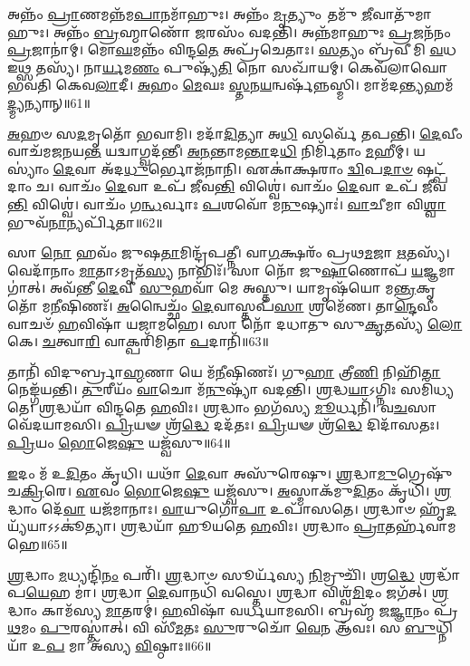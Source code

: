 𑌅𑌨𑍍𑌨𑌂᳴ \ul{𑌪𑍍𑌰𑌾}\-𑌣𑌮𑌨𑍍𑌨᳴𑌮\-\ul{𑌪𑌾}\-𑌨𑌮𑌾᳴𑌹𑍁𑌃।
𑌅𑌨𑍍𑌨𑌂᳴ \ul{𑌮𑍃}\-𑌤𑍍𑌯𑍁𑌂 𑌤𑌮𑍁᳴ \ul{𑌜𑍀}\-𑌵𑌾𑌤𑍁᳴𑌮𑌾𑌹𑍁𑌃।
𑌅𑌨𑍍𑌨𑌂᳴ \ul{𑌬𑍍𑌰}\-𑌹𑍍𑌮𑌾𑌣𑍋᳴ \ul{𑌜}\-𑌰𑌸𑌂᳴  𑌵𑌦𑌨𑍍𑌤𑌿।
𑌅𑌨𑍍𑌨᳴𑌮𑌾𑌹𑍁𑌃 \ul{𑌪𑍍𑌰}\-𑌜𑌨᳴𑌨𑌂 \ul{𑌪𑍍𑌰}\-𑌜𑌾𑌨𑌾॑𑌮𑍍।
𑌮𑍋\-\ul{𑌘}\-𑌮𑌨𑍍𑌨𑌂᳴ 𑌵𑌿𑌨𑍍𑌦\-\ul{𑌤𑍇} 𑌅𑌪𑍍𑌰᳴𑌚𑍇𑌤𑌾𑌃।
\-\ul{𑌸}\-𑌤𑍍𑌯𑌂 𑌬𑍍𑌰᳴𑌵𑍀𑌮𑌿 \ul{𑌵}\-𑌧 𑌇𑌥𑍍𑌸 𑌤𑌸𑍍𑌯᳴।
𑌨𑌾\-\ul{𑌰𑍍𑌯}\-𑌮\-\ul{𑌣𑌂} 𑌪𑍁𑌷𑍍𑌯᳴\-\ul{𑌤𑌿} 𑌨𑍋 𑌸𑌖𑌾᳴𑌯𑌮𑍍।
𑌕𑍇𑌵᳴𑌲𑌾𑌘𑍋 𑌭𑌵𑌤𑌿 𑌕𑍇𑌵\-\ul{𑌲𑌾}\-𑌦𑍀।
\-\ul{𑌅}\-𑌹𑌂 \ul{𑌮𑍇}\-𑌘𑌃 \ul{𑌸𑍍𑌤}\-𑌨\-\ul{𑌯}\-𑌨𑍍𑌵𑌰𑍍\mbox{}𑌷᳴𑌨𑍍𑌨𑌸𑍍𑌮𑌿।
𑌮𑌾𑌮᳴𑌦\-\ul{𑌨𑍍𑌤𑍍𑌯}\-𑌹𑌮᳴\-\ul{𑌦𑍍𑌮𑍍𑌯}\-𑌨𑍍𑌯𑌾𑌨𑍍॥61॥

\-\ul{𑌅}\-𑌹𑍞 𑌸\-\ul{𑌦}\-𑌮𑍃𑌤𑍋᳴ 𑌭𑌵𑌾𑌮𑌿।
𑌮𑌦𑌾᳴\-\ul{𑌦𑌿}\-𑌤𑍍𑌯𑌾 𑌅\-\ul{𑌧𑌿} 𑌸𑌰𑍍𑌵𑍇᳴ 𑌤𑌪𑌨𑍍𑌤𑌿।
\-\ul{𑌦𑍇}\-𑌵𑍀𑌂 𑌵𑌾𑌚᳴𑌮𑌜𑌨𑌯\-\ul{𑌨𑍍𑌤} 𑌯𑌦𑍍𑌵𑌾𑌗𑍍𑌵𑌦᳴𑌨𑍍𑌤𑍀।
\-\ul{𑌅}\-\-\ul{𑌨}\-𑌨𑍍𑌤𑌾𑌮\-\ul{𑌨𑍍𑌤𑌾}\-𑌦\-\ul{𑌧𑌿} 𑌨𑌿𑌰𑍍𑌮𑌿᳴𑌤𑌾𑌂 \ul{𑌮}\-𑌹𑍀𑌮𑍍।
𑌯𑌸𑍍𑌯𑌾𑌂॑ \ul{𑌦𑍇}\-𑌵𑌾 𑌅᳴𑌦\-\ul{𑌧𑍁}\-𑌰𑍍𑌭𑍋𑌜᳴𑌨𑌾𑌨𑌿।
𑌏𑌕𑌾॑𑌕𑍍𑌷𑌰𑌾𑌂 \ul{𑌦𑍍𑌵𑌿}\-𑌪\-\ul{𑌦𑌾}\-\-\ul{𑍞} 𑌷𑌟𑍍𑌪᳴𑌦𑌾𑌂 𑌚।
𑌵𑌾𑌚𑌂᳴ \ul{𑌦𑍇}\-𑌵𑌾 𑌉𑌪᳴ 𑌜𑍀𑌵\-\ul{𑌨𑍍𑌤𑌿} 𑌵𑌿𑌶𑍍𑌵𑍇॑।
𑌵𑌾𑌚𑌂᳴ \ul{𑌦𑍇}\-𑌵𑌾 𑌉𑌪᳴ 𑌜𑍀𑌵\-\ul{𑌨𑍍𑌤𑌿} 𑌵𑌿𑌶𑍍𑌵𑍇॑।
𑌵𑌾𑌚𑌂᳴ 𑌗\-\ul{𑌨𑍍𑌧}\-𑌰𑍍𑌵𑌾𑌃 \ul{𑌪}\-𑌶𑌵𑍋᳴ 𑌮\-\ul{𑌨𑍁}\-𑌷𑍍𑌯𑌾𑌃॑।
\-\ul{𑌵𑌾}\-𑌚𑍀𑌮𑌾 𑌵𑌿\-\ul{𑌶𑍍𑌵𑌾} 𑌭𑍁𑌵᳴\-\ul{𑌨𑌾}\-𑌨𑍍𑌯𑌰𑍍𑌪𑌿᳴𑌤𑌾॥62॥

𑌸𑌾 \ul{𑌨𑍋} 𑌹𑌵𑌂᳴ 𑌜𑍁𑌷\-\ul{𑌤𑌾}\-𑌮𑌿𑌨𑍍𑌦𑍍𑌰᳴𑌪𑌤𑍍𑌨𑍀।
𑌵𑌾\-\ul{𑌗}\-𑌕𑍍𑌷𑌰𑌂᳴ 𑌪𑍍𑌰𑌥\-\ul{𑌮}\-𑌜𑌾 \ul{𑌋}\-𑌤𑌸𑍍𑌯᳴।
𑌵𑍇𑌦𑌾᳴𑌨𑌾𑌂 \ul{𑌮𑌾}\-𑌤𑌾\-𑌽𑌮𑍃𑌤᳴\-\ul{𑌸𑍍𑌯} 𑌨𑌾𑌭𑌿𑌃᳴।
𑌸𑌾 𑌨𑍋᳴ 𑌜𑍁\-\ul{𑌷𑌾}\-𑌣𑍋𑌪᳴ \ul{𑌯}\-𑌜𑍍𑌞𑌮𑌾𑌗𑌾॑𑌤𑍍।
𑌅𑌵᳴𑌨𑍍𑌤𑍀 \ul{𑌦𑍇}\-𑌵𑍀 \ul{𑌸𑍁}\-𑌹𑌵𑌾᳴ 𑌮𑍇 𑌅𑌸𑍍𑌤𑍁।
𑌯𑌾𑌮𑍃𑌷᳴𑌯𑍋 𑌮\-\ul{𑌨𑍍𑌤𑍍𑌰}\-𑌕𑍃𑌤𑍋᳴ 𑌮\-\ul{𑌨𑍀}\-𑌷𑌿𑌣𑌃᳴।
\-\ul{𑌅}\-𑌨𑍍𑌵𑍈𑌚𑍍𑌛𑌂᳴ \ul{𑌦𑍇}\-𑌵𑌾𑌸𑍍𑌤𑌪᳴\-\ul{𑌸𑌾} 𑌶𑍍𑌰𑌮𑍇᳴𑌣।
𑌤𑌾\-\ul{𑌨𑍍𑌦𑍇}\-𑌵𑍀𑌂 𑌵𑌾𑌚𑍞᳴ \ul{𑌹}\-𑌵𑌿𑌷𑌾᳴ 𑌯𑌜𑌾𑌮𑌹𑍇।
𑌸𑌾 𑌨𑍋᳴ 𑌦𑌧𑌾𑌤𑍁 𑌸𑍁\-\ul{𑌕𑍃}\-𑌤𑌸𑍍𑌯᳴ \ul{𑌲𑍋}\-𑌕𑍇।
\-\ul{𑌚}\-𑌤𑍍𑌵𑌾\-\ul{𑌰𑌿} 𑌵𑌾𑌕𑍍𑌪𑌰𑌿᳴𑌮𑌿𑌤𑌾 \ul{𑌪}\-𑌦𑌾𑌨𑌿᳴॥63॥

𑌤𑌾𑌨𑌿᳴ 𑌵𑌿𑌦𑍁𑌰𑍍𑌬𑍍𑌰𑌾\-\ul{𑌹𑍍𑌮}\-𑌣𑌾 𑌯𑍇 𑌮᳴\-\ul{𑌨𑍀}\-𑌷𑌿𑌣𑌃᳴।
𑌗𑍁\-\ul{𑌹𑌾} 𑌤𑍍𑌰𑍀\-\ul{𑌣𑌿} 𑌨𑌿𑌹𑌿᳴\-\ul{𑌤𑌾} 𑌨𑍇𑌙𑍍𑌗᳴𑌯𑌨𑍍𑌤𑌿।
\-\ul{𑌤𑍁}\-𑌰𑍀𑌯𑌂᳴ \ul{𑌵𑌾}\-𑌚𑍋 𑌮᳴\-\ul{𑌨𑍁}\-𑌷𑍍𑌯𑌾᳴ 𑌵𑌦𑌨𑍍𑌤𑌿।
\-\ul{𑌶𑍍𑌰}\-𑌦𑍍𑌧\-\ul{𑌯𑌾}\-\-𑌽𑌗𑍍𑌨𑌿𑌃 𑌸𑌮𑌿᳴𑌧𑍍𑌯𑌤𑍇।
\-\ul{𑌶𑍍𑌰}\-𑌦𑍍𑌧𑌯𑌾᳴ 𑌵𑌿𑌨𑍍𑌦𑌤𑍇 \ul{𑌹}\-𑌵𑌿𑌃।
\-\ul{𑌶𑍍𑌰}\-𑌦𑍍𑌧𑌾𑌂 𑌭𑌗᳴𑌸𑍍𑌯 \ul{𑌮𑍂}\-𑌰𑍍𑌧𑌨𑌿᳴।
𑌵\-\ul{𑌚}\-𑌸𑌾 𑌵𑍇᳴𑌦𑌯𑌾𑌮𑌸𑌿।
\-\ul{𑌪𑍍𑌰𑌿}\-𑌯𑍟 𑌶𑍍𑌰᳴\-\ul{𑌦𑍍𑌧𑍇} 𑌦𑌦᳴𑌤𑌃।
\-\ul{𑌪𑍍𑌰𑌿}\-𑌯𑍟 𑌶𑍍𑌰᳴\-\ul{𑌦𑍍𑌧𑍇} 𑌦𑌿𑌦𑌾᳴𑌸𑌤𑌃।
\-\ul{𑌪𑍍𑌰𑌿}\-𑌯𑌂 \ul{𑌭𑍋}\-𑌜𑍇\-\ul{𑌷𑍁} 𑌯𑌜𑍍𑌵᳴𑌸𑍁॥64॥

\-\ul{𑌇}\-𑌦𑌂 𑌮᳴ 𑌉\-\ul{𑌦𑌿}\-𑌤𑌂 𑌕𑍃᳴𑌧𑌿।
𑌯𑌥𑌾᳴ \ul{𑌦𑍇}\-𑌵𑌾 𑌅𑌸𑍁᳴𑌰𑍇𑌷𑍁।
\-\ul{𑌶𑍍𑌰}\-𑌦𑍍𑌧𑌾\-\ul{𑌮𑍁}\-𑌗𑍍𑌰𑍇𑌷𑍁᳴ 𑌚\-\ul{𑌕𑍍𑌰𑌿}\-𑌰𑍇।
\-\ul{𑌏}\-𑌵𑌂 \ul{𑌭𑍋}\-𑌜𑍇\-\ul{𑌷𑍁} 𑌯𑌜𑍍𑌵᳴𑌸𑍁।
\-\ul{𑌅}\-𑌸𑍍𑌮𑌾𑌕᳴𑌮𑍁\-\ul{𑌦𑌿}\-𑌤𑌂 𑌕𑍃᳴𑌧𑌿।
\-\ul{𑌶𑍍𑌰}\-𑌦𑍍𑌧𑌾𑌂 𑌦𑍇᳴\-\ul{𑌵𑌾} 𑌯𑌜᳴𑌮𑌾𑌨𑌾𑌃।
\-\ul{𑌵𑌾}\-𑌯𑍁𑌗𑍋᳴\-\ul{𑌪𑌾} 𑌉𑌪𑌾᳴𑌸𑌤𑍇।
\-\ul{𑌶𑍍𑌰}\-𑌦𑍍𑌧𑌾𑍞 𑌹𑍃᳴\-\ul{𑌦}\-𑌯𑍍𑌯᳴𑌯𑌾\-𑌽𑌽𑌕𑍂॑𑌤𑍍𑌯𑌾।
\-\ul{𑌶𑍍𑌰}\-𑌦𑍍𑌧𑌯𑌾᳴ 𑌹𑍂𑌯𑌤𑍇 \ul{𑌹}\-𑌵𑌿𑌃।
\-\ul{𑌶𑍍𑌰}\-𑌦𑍍𑌧𑌾𑌂 \ul{𑌪𑍍𑌰𑌾}\-𑌤𑌰𑍍\mbox{}𑌹᳴𑌵𑌾𑌮𑌹𑍇॥65॥

\-\ul{𑌶𑍍𑌰}\-𑌦𑍍𑌧𑌾𑌂 \ul{𑌮}\-𑌧𑍍𑌯𑌨𑍍𑌦𑌿᳴\-\ul{𑌨𑌂} 𑌪𑌰𑌿᳴।
\-\ul{𑌶𑍍𑌰}\-𑌦𑍍𑌧𑌾𑍞 𑌸𑍂𑌰𑍍𑌯᳴𑌸𑍍𑌯 \ul{𑌨𑌿}\-𑌮𑍍𑌰𑍁𑌚𑌿᳴।
𑌶𑍍𑌰\-\ul{𑌦𑍍𑌧𑍇} 𑌶𑍍𑌰𑌦𑍍𑌧𑌾᳴𑌪\-\ul{𑌯𑍇}\-𑌹 𑌮𑌾॑।
\-\ul{𑌶𑍍𑌰}\-𑌦𑍍𑌧𑌾 \ul{𑌦𑍇}\-𑌵𑌾𑌨𑌧𑌿᳴ 𑌵𑌸𑍍𑌤𑍇।
\-\ul{𑌶𑍍𑌰}\-𑌦𑍍𑌧𑌾 𑌵𑌿𑌶𑍍𑌵᳴\-\ul{𑌮𑌿}\-𑌦𑌂 𑌜𑌗᳴𑌤𑍍।
\-\ul{𑌶𑍍𑌰}\-𑌦𑍍𑌧𑌾𑌂 𑌕𑌾𑌮᳴𑌸𑍍𑌯 \ul{𑌮𑌾}\-𑌤𑌰𑌮𑍍॑।
\-\ul{𑌹}\-𑌵𑌿𑌷𑌾᳴ 𑌵𑌰𑍍𑌧𑌯𑌾𑌮𑌸𑌿।
𑌬𑍍𑌰𑌹𑍍𑌮᳴ 𑌜\-\ul{𑌜𑍍𑌞𑌾}\-𑌨𑌂 𑌪𑍍𑌰᳴\-\ul{𑌥}\-𑌮𑌂 \ul{𑌪𑍁}\-𑌰𑌸𑍍𑌤𑌾॑𑌤𑍍।
𑌵𑌿 𑌸𑍀᳴\-\ul{𑌮}\-𑌤𑌃 \ul{𑌸𑍁}\-𑌰𑍁𑌚𑍋᳴ \ul{𑌵𑍇}\-𑌨 𑌆᳴𑌵𑌃।
𑌸 \ul{𑌬𑍁}\-𑌧𑍍𑌨𑌿𑌯𑌾᳴ 𑌉\-\ul{𑌪} 𑌮𑌾 𑌅᳴𑌸𑍍𑌯 \ul{𑌵𑌿}\-𑌷𑍍𑌠𑌾𑌃॥66॥

